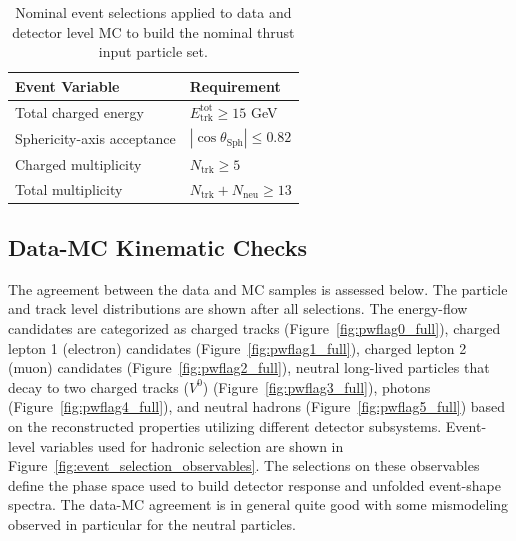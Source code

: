 \begin{table}[ht!]
\centering
\begin{tabular}{@{}p{}p{}@{}}
\hline
Event Variable & Requirement \\
\hline
Total charged energy & $E_{\mathrm{trk}}^{\mathrm{tot}}\ge 15$ GeV \\
Sphericity-axis acceptance & $|\cos\theta_{\mathrm{Sph}}|\le 0.82$ \\
Charged multiplicity & $N_{\mathrm{trk}}\ge 5$ \\
Total multiplicity & $N_{\mathrm{trk}}+N_{\mathrm{neu}}\ge 13$ \\
\hline
\end{tabular}
\caption{Nominal event selections applied to data and detector level MC to build the nominal thrust input particle set.}
\label{tab:event_selection_summary}
\end{table}


\subsection{Data-MC Kinematic Checks}

The agreement between the data and MC samples is assessed below. The particle and track level distributions are shown after all selections. The energy-flow candidates are categorized as charged tracks (Figure~\ref{fig:pwflag0_full}), charged lepton 1 (electron) candidates (Figure~\ref{fig:pwflag1_full}), charged lepton 2 (muon) candidates (Figure~\ref{fig:pwflag2_full}), neutral long-lived particles that decay to two charged tracks ($V^{0}$) (Figure~\ref{fig:pwflag3_full}), photons (Figure~\ref{fig:pwflag4_full}), and neutral hadrons (Figure~\ref{fig:pwflag5_full}) based on the reconstructed properties utilizing different detector subsystems. Event-level variables used for hadronic selection are shown in Figure~\ref{fig:event_selection_observables}. The selections on these observables define the phase space used to build detector response and unfolded event-shape spectra. The data-MC agreement is in general quite good with some mismodeling observed in particular for the neutral particles.

